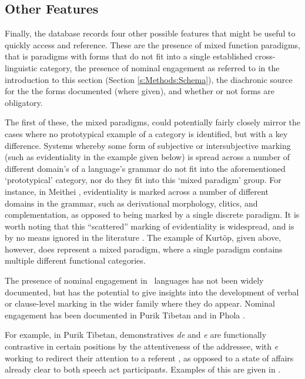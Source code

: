 \subsection{Other Features}
Finally, the database records four other possible features that might be useful to quickly access and reference. These are the presence of mixed function paradigms, that is paradigms with forms that do not fit into a single established cross-linguistic category, the presence of nominal engagement as referred to in the introduction to this section (Section \ref{s:Methods:Schema}), the diachronic source for the the forms documented (where given), and whether or not forms are obligatory.

The first of these, the mixed paradigms, could potentially fairly closely mirror the cases where no prototypical example of a category is identified, but with a key difference. Systems whereby some form of subjective or intersubjective marking (such as evidentiality in the example given below) is spread across a number of different domain's of a language's grammar do not fit into the aforementioned `prototypical' category, nor do they fit into this `mixed paradigm' group. For instance, in Meithei \cite[295]{Chelliah1997}, evidentiality is marked across a number of different domains in the grammar, such as derivational morphology, clitics, and complementation, as opposed to being marked by a single discrete paradigm. It is worth noting that this ``scattered'' marking of evidentiality is widespread, and is by no means ignored in the literature \cite[23]{Aikhenvald2014}. The example of Kurtöp, given above, however, does represent a mixed paradigm, where a single paradigm contains multiple different functional categories.

The presence of nominal engagement in \lfam\ languages has not been widely documented, but has the potential to give insights into the development of verbal or clause-level marking in the wider family where they do appear. Nominal engagement has been documented in Purik Tibetan \cite[Tibetic: India:][]{Zemp2021} and in Phola \cite[Ngwi-Burmese, PRC:][]{GonzalezPerez2023}.

For example, in Purik Tibetan, demonstratives \textit{de} and \textit{e} are functionally contrastive in certain positions by the attentiveness of the addressee, with \textit{e} working to redirect their attention to a referent \cite{Zemp2021}, as opposed to a state of affairs already clear to both speech act participants. Examples of this are given in .

